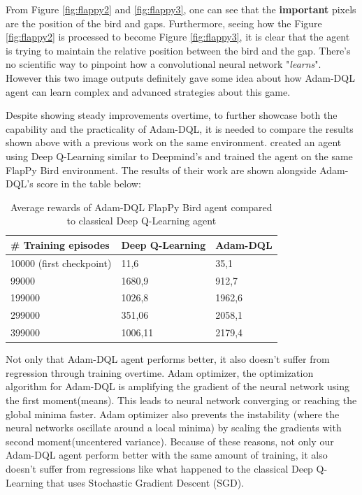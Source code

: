     From Figure \ref{fig:flappy2} and \ref{fig:flappy3}, one can see that the \textbf{important} pixels are the position of the bird and gaps. Furthermore, seeing how the Figure \ref{fig:flappy2} is processed to become Figure \ref{fig:flappy3}, it is clear that the agent is trying to maintain the relative position between the bird and the gap. There's no scientific way to pinpoint how a convolutional neural network "\textit{learns}". However this two image outputs definitely gave some idea about how Adam-DQL agent can learn complex and advanced strategies about this game.
    \par
    Despite showing steady improvements overtime, to further showcase both the capability and the practicality of Adam-DQL, it is needed to compare the results shown above with a previous work on the same environment. \cite{flappyDL} created an agent using Deep Q-Learning similar to Deepmind's \cite{mnih2015humanlevel} and trained the agent on the same FlapPy Bird environment. The results of their work are shown alongside Adam-DQL's score in the table below:
    
        \begin{table}[H]
    \centering
        \label{flappycomparison}
    \begin{tabular}{|l|l|l|}
    \hline
    \# Training episodes     & Deep Q-Learning & Adam-DQL \\ \hline
    10000 (first checkpoint) & 11,6            & 35,1     \\ \hline
    99000                    & 1680,9          & 912,7   \\ \hline
    199000                   & 1026,8          & 1962,6   \\ \hline
    299000                   & 351,06          & 2058,1   \\ \hline
    399000                   & 1006,11         & 2179,4   \\ \hline
    \end{tabular}
    \caption[Average rewards of Adam-DQL FlapPy Bird agent compared to classical Deep Q-Learning agent]{Average rewards of Adam-DQL FlapPy Bird agent compared to classical Deep Q-Learning agent \cite{flappyDL} }
    \end{table}

    Not only that Adam-DQL agent performs better, it also doesn't suffer from regression through training overtime. Adam optimizer, the optimization algorithm for Adam-DQL is amplifying the gradient of the neural network using the first moment(means). This leads to neural network converging or reaching the global minima faster. Adam optimizer also prevents the instability (where the neural networks oscillate around a local minima) by scaling the gradients with second moment(uncentered variance). Because of these reasons, not only our Adam-DQL agent perform better with the same amount of training, it also doesn't suffer from regressions like what happened to the classical Deep Q-Learning that uses Stochastic Gradient Descent (SGD).
    
